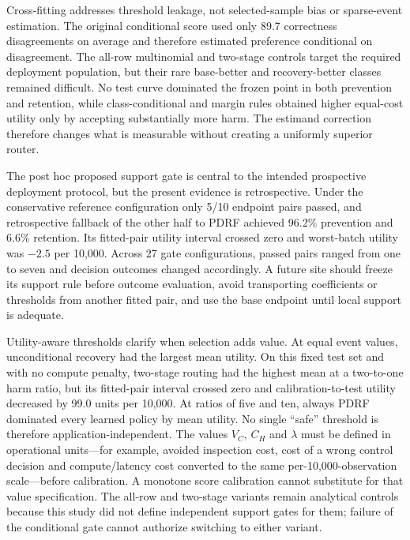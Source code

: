 \documentclass[11pt]{article}
\begin{document}
Cross-fitting addresses threshold leakage, not selected-sample bias or sparse-event estimation. The original conditional score used only 89.7 correctness disagreements on average and therefore estimated preference conditional on disagreement. The all-row multinomial and two-stage controls target the required deployment population, but their rare base-better and recovery-better classes remained difficult. No test curve dominated the frozen point in both prevention and retention, while class-conditional and margin rules obtained higher equal-cost utility only by accepting substantially more harm. The estimand correction therefore changes what is measurable without creating a uniformly superior router.

The post hoc proposed support gate is central to the intended prospective deployment protocol, but the present evidence is retrospective. Under the conservative reference configuration only 5/10 endpoint pairs passed, and retrospective fallback of the other half to PDRF achieved 96.2\% prevention and 6.6\% retention. Its fitted-pair utility interval crossed zero and worst-batch utility was $-2.5$ per 10,000. Across 27 gate configurations, passed pairs ranged from one to seven and decision outcomes changed accordingly. A future site should freeze its support rule before outcome evaluation, avoid transporting coefficients or thresholds from another fitted pair, and use the base endpoint until local support is adequate.

Utility-aware thresholds clarify when selection adds value. At equal event values, unconditional recovery had the largest mean utility. On this fixed test set and with no compute penalty, two-stage routing had the highest mean at a two-to-one harm ratio, but its fitted-pair interval crossed zero and calibration-to-test utility decreased by 99.0 units per 10,000. At ratios of five and ten, always PDRF dominated every learned policy by mean utility. No single ``safe'' threshold is therefore application-independent. The values $V_C$, $C_H$ and $\lambda$ must be defined in operational units---for example, avoided inspection cost, cost of a wrong control decision and compute/latency cost converted to the same per-10,000-observation scale---before calibration. A monotone score calibration cannot substitute for that value specification. The all-row and two-stage variants remain analytical controls because this study did not define independent support gates for them; failure of the conditional gate cannot authorize switching to either variant.
\end{document}
